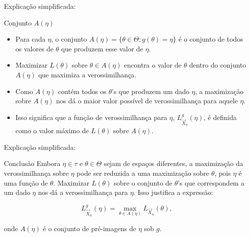 \documentclass[12pt]{beamer}
\begin{document}
\begin{frame}{Explicação simplificada:}

	\begin{block}{Conjunto \( A(\eta) \)}
		\begin{itemize}
			\justifying
			\item Para cada \( \eta \), o conjunto \( A(\eta) = \{\theta \in \Theta; g(\theta) = \eta\} \) é o conjunto de todos os valores de \( \theta \) que produzem esse valor de \( \eta \).
			\item Maximizar \( L(\theta) \) sobre \( \theta \in A(\eta) \) encontra o valor de \( \theta \) dentro do conjunto \( A(\eta) \) que maximiza a verossimilhança.
			\item Como \( A(\eta) \) contém todos os \( \theta \)'s que produzem um dado \( \eta \), a maximização sobre \( A(\eta) \) nos dá o maior valor possível de verossimilhança para aquele \( \eta \).
			\item Isso significa que a função de verossimilhança para \( \eta \), \( L_{\vec{X}_n}^{g}(\eta) \), é definida como o valor máximo de \( L(\theta) \) sobre \( A(\eta) \).
			
		\end{itemize}
	\end{block}
\end{frame}

\begin{frame}{Explicação simplificada:}
	\begin{block}{Conclusão}
		\justifying
	Embora \( \eta \in \tau \) e \( \theta \in \Theta \) sejam de espaços diferentes, a maximização da verossimilhança sobre \( \eta \) pode ser reduzida a uma maximização sobre \( \theta \), pois \( \eta \) é uma função de \( \theta \). Maximizar \( L(\theta) \) sobre o conjunto de \( \theta \)'s que correspondem a um dado \( \eta \) nos dá a verossimilhança para \( \eta \). Isso justifica a expressão:
	
	\[
	L_{\vec{X}_n}^{g}(\eta) = \max_{\theta \in A(\eta)} L_{\vec{X}_n}(\theta),
	\]
	
	onde \( A(\eta) \) é o conjunto de pré-imagens de \( \eta \) sob \( g \).
	\end{block}
\end{frame}
\end{document}
